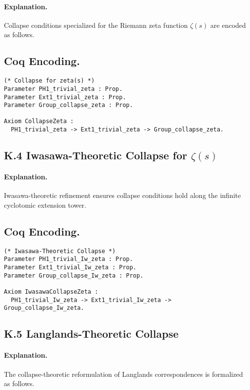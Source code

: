 \documentclass[11pt]{article}
\begin{document}
\paragraph{Explanation.}  
Collapse conditions specialized for the Riemann zeta function $\zeta(s)$ are encoded as follows.

\subsection*{Coq Encoding.}

\begin{lstlisting}[language=Coq, caption=Coq Encoding.]
(* Collapse for zeta(s) *)
Parameter PH1_trivial_zeta : Prop.
Parameter Ext1_trivial_zeta : Prop.
Parameter Group_collapse_zeta : Prop.

Axiom CollapseZeta :
  PH1_trivial_zeta -> Ext1_trivial_zeta -> Group_collapse_zeta.
\end{lstlisting}

\subsection*{K.4 Iwasawa-Theoretic Collapse for $\zeta(s)$}

\paragraph{Explanation.}  
Iwasawa-theoretic refinement ensures collapse conditions hold along the infinite cyclotomic extension tower.

\subsection*{Coq Encoding.}

\begin{lstlisting}[language=Coq, caption=Coq Encoding.]
(* Iwasawa-Theoretic Collapse *)
Parameter PH1_trivial_Iw_zeta : Prop.
Parameter Ext1_trivial_Iw_zeta : Prop.
Parameter Group_collapse_Iw_zeta : Prop.

Axiom IwasawaCollapseZeta :
  PH1_trivial_Iw_zeta -> Ext1_trivial_Iw_zeta -> Group_collapse_Iw_zeta.
\end{lstlisting}

\subsection*{K.5 Langlands-Theoretic Collapse}

\paragraph{Explanation.}  
The collapse-theoretic reformulation of Langlands correspondences is formalized as follows.
\end{document}

